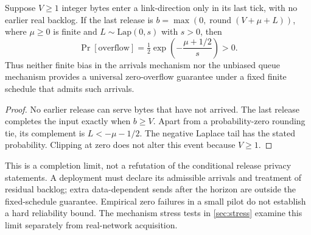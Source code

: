 \begin{proposition}\label{prop:completion}
Suppose $V\ge1$ integer bytes enter a link-direction only in its last tick, with no earlier real backlog. If the last release is $b=\max(0,\operatorname{round}(V+\mu+L))$, where $\mu\ge0$ is finite and $L\sim\mathrm{Lap}(0,s)$ with $s>0$, then
\[
 \Pr[\text{overflow}]=\tfrac12\exp\!\left(-\frac{\mu+1/2}{s}\right)>0.
\]
Thus neither finite bias in the arrivals mechanism nor the unbiased queue mechanism provides a universal zero-overflow guarantee under a fixed finite schedule that admits such arrivals.
\end{proposition}
\begin{proof}
No earlier release can serve bytes that have not arrived. The last release completes the input exactly when $b\ge V$. Apart from a probability-zero rounding tie, its complement is $L<-\mu-1/2$. The negative Laplace tail has the stated probability. Clipping at zero does not alter this event because $V\ge1$.
\end{proof}
This is a completion limit, not a refutation of the conditional release privacy statements. A deployment must declare its admissible arrivals and treatment of residual backlog; extra data-dependent sends after the horizon are outside the fixed-schedule guarantee. Empirical zero failures in a small pilot do not establish a hard reliability bound. The mechanism stress tests in \cref{sec:stress} examine this limit separately from real-network acquisition.

